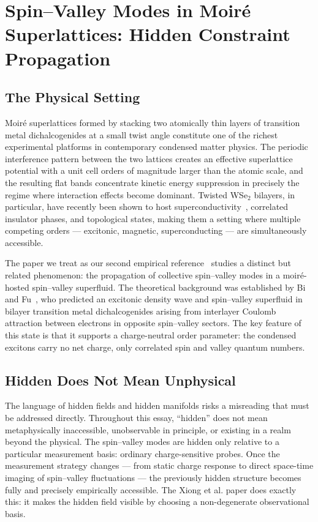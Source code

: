 \documentclass[11pt,a4paper]{article}
\theoremstyle{plain}
\theoremstyle{definition}
\theoremstyle{remark}
\begin{document}
\section{Spin--Valley Modes in Moiré Superlattices: Hidden Constraint Propagation}
\label{sec:moire}

\subsection{The Physical Setting}

Moiré superlattices formed by stacking two atomically thin layers of
transition metal dichalcogenides at a small twist angle constitute one of
the richest experimental platforms in contemporary condensed matter physics.
The periodic interference pattern between the two lattices creates an
effective superlattice potential with a unit cell orders of magnitude larger
than the atomic scale, and the resulting flat bands concentrate kinetic
energy suppression in precisely the regime where interaction effects become
dominant. Twisted WSe$_2$ bilayers, in particular, have recently been shown
to host superconductivity~\cite{Xia2025,Guo2025}, correlated insulator
phases, and topological states, making them a setting where multiple
competing orders --- excitonic, magnetic, superconducting --- are
simultaneously accessible.

The paper we treat as our second empirical reference~\cite{Xiong2026}
studies a distinct but related phenomenon: the propagation of collective
spin--valley modes in a moiré-hosted spin--valley superfluid. The
theoretical background was established by Bi and Fu~\cite{BiFu2021}, who
predicted an excitonic density wave and spin--valley superfluid in bilayer
transition metal dichalcogenides arising from interlayer Coulomb attraction
between electrons in opposite spin--valley sectors. The key feature of this
state is that it supports a charge-neutral order parameter: the condensed
excitons carry no net charge, only correlated spin and valley quantum
numbers.

\subsection{Hidden Does Not Mean Unphysical}

The language of hidden fields and hidden manifolds risks a misreading that
must be addressed directly. Throughout this essay, ``hidden'' does not mean
metaphysically inaccessible, unobservable in principle, or existing in a
realm beyond the physical. The spin--valley modes are hidden only relative
to a particular measurement basis: ordinary charge-sensitive probes.
Once the measurement strategy changes --- from static charge response to
direct space-time imaging of spin--valley fluctuations --- the previously
hidden structure becomes fully and precisely empirically accessible. The
Xiong et al. paper does exactly this: it makes the hidden field visible by
choosing a non-degenerate observational basis.
\end{document}
